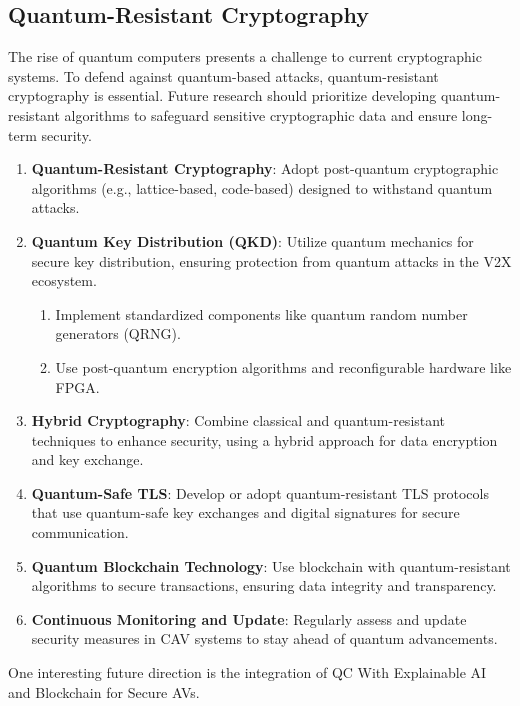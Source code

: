 \subsection{Quantum-Resistant Cryptography}\label{subsec:quantum-resistant-cryptography-in-future-avs}
The rise of quantum computers presents a challenge to current cryptographic systems.
To defend against quantum-based attacks, quantum-resistant cryptography is essential.
Future research should prioritize
developing quantum-resistant algorithms to safeguard sensitive cryptographic data and ensure long-term security\cite{ahmad2023machine, admass2023cyber}.

\begin{enumerate}
    \item \textbf{Quantum-Resistant Cryptography}:
    Adopt post-quantum cryptographic algorithms (e.g., lattice-based, code-based) designed to withstand quantum attacks.
    \item \textbf{Quantum Key Distribution (QKD)}: Utilize quantum mechanics for secure key distribution,
    ensuring protection from quantum attacks in the V2X ecosystem.
    \begin{enumerate}
        \item Implement standardized components like quantum random number generators (QRNG).
        \item Use post-quantum encryption algorithms and reconfigurable hardware like FPGA.
    \end{enumerate}
    \item \textbf{Hybrid Cryptography}: Combine classical and quantum-resistant techniques to enhance security,
    using a hybrid approach for data encryption and key exchange.
    \item \textbf{Quantum-Safe TLS}:
    Develop or adopt quantum-resistant TLS protocols
    that use quantum-safe key exchanges and digital signatures for secure communication.
    \item \textbf{Quantum Blockchain Technology}: Use blockchain with quantum-resistant algorithms to secure transactions,
    ensuring data integrity and transparency.
    \item \textbf{Continuous Monitoring and Update}:
    Regularly assess and update security measures in CAV systems to stay ahead of quantum advancements.
\end{enumerate}

One interesting future direction is the integration of QC With Explainable
AI and Blockchain for Secure AVs\cite{bendiab2023autonomous}.


